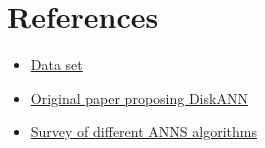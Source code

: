 \section{References}

\begin{itemize}
    \item \href{http://corpus-texmex.irisa.fr/}{Data set}
    \item \href{https://papers.nips.cc/paper_files/paper/2019/file/09853c7fb1d3f8ee67a61b6bf4a7f8e6-Paper.pdf}{Original paper proposing DiskANN}
    \item \href{https://arxiv.org/pdf/2305.04359.pdf}{Survey of different ANNS algorithms}
\end{itemize}
